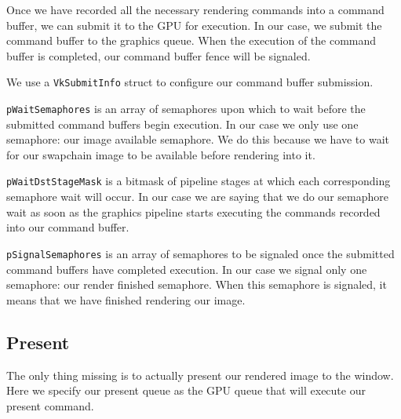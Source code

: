 Once we have recorded all the necessary rendering commands into a command
buffer, we can submit it to the GPU for execution.
In our case, we submit the command buffer to the graphics queue.
When the execution of the command buffer is completed, our command buffer fence
will be signaled.

\begin{minipage}{\linewidth}{\noindent}
    
\end{minipage}

We use a \texttt{VkSubmitInfo} struct to configure our command buffer submission.

\texttt{pWaitSemaphores} is an array of semaphores upon which to wait before
the submitted command buffers begin execution.
In our case we only use one semaphore: our image available semaphore.
We do this because we have to wait for our swapchain image to be
available before rendering into it.

\texttt{pWaitDstStageMask} is a bitmask of pipeline stages at which
each corresponding semaphore wait will occur.
In our case we are saying that we do our semaphore wait as soon as the graphics
pipeline starts executing the commands recorded into our command buffer.

\texttt{pSignalSemaphores} is an array of semaphores to be signaled once
the submitted command buffers have completed execution.
In our case we signal only one semaphore: our render finished semaphore.
When this semaphore is signaled, it means that we have finished rendering our
image.

\begin{minipage}{\linewidth}{\noindent}
    
\end{minipage}

\subsection{Present}

The only thing missing is to actually present our rendered image to the window.
Here we specify our present queue as the GPU queue that will execute our present
command.

\begin{minipage}{\linewidth}{\noindent}
    
\end{minipage}

